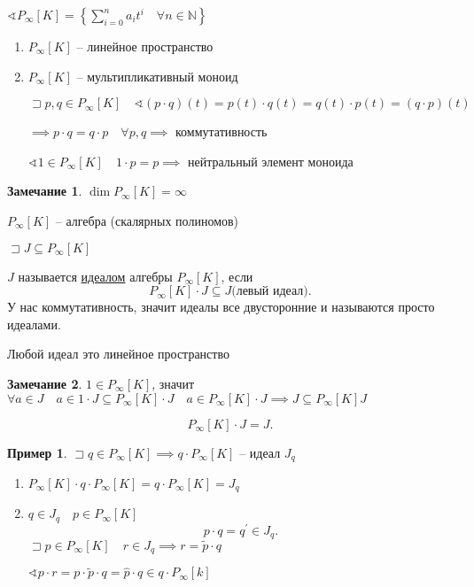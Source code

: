 \documentclass{book}
\newcommand\N{\ensuremath{\mathbb{N}}}
\newcommand{\p}[1]{#1^{\prime}}
\newcommand{\tl}[1]{\widetilde{#1}}
\theoremstyle{definition}
\newtheorem*{note}{Замечание}
\newtheorem*{example}{Пример}
\begin{document}
$\sphericalangle P_{\infty }[K] = \left\{ \sum_{i=0}^{n} a_it^i\quad \forall n\in \N  \right\} $

\begin{enumerate}
    \item $P_{\infty }[K]$ -- линейное пространство
    \item $P_{\infty }[K]$ -- мультипликативный моноид

        $\sqsupset p, q\in P_{\infty }[K]\quad \sphericalangle (p\cdot q)(t) = p(t)\cdot q(t) = q(t)\cdot p(t) = \left( q\cdot p \right) (t)$

        $\implies p\cdot q = q\cdot p\quad \forall p, q\implies $ коммутативность

        $\sphericalangle 1\in P_{\infty }[K]\quad 1\cdot p = p \implies $ нейтральный элемент моноида
\end{enumerate}

\begin{note}
    $\dim P_{\infty }[K] = \infty $
\end{note}

\begin{statement}
    $P_{\infty }[K]$ -- алгебра (скалярных полиномов)
\end{statement}

$\sqsupset J\subseteq P_{\infty }[K]$

\begin{definition}
    $J$ называется \underline{идеалом} алгебры  $P_{\infty }[K]$, если \[
        P_{\infty }[K] \cdot  J\subseteq J \text{(левый идеал)}
    .\]     
    У нас коммутативность, значит идеалы все двусторонние и называются просто идеалами.

    Любой идеал это линейное пространство
\end{definition}

\begin{note}
    $1\in P_{\infty }[K]$, значит $\forall a\in J\quad a\in 1\cdot J\subseteq P_{\infty }[K]\cdot J\quad a\in P_{\infty }[K]\cdot J \implies J\subseteq P_{\infty }[K]J$

    \[
        P_{\infty }[K]\cdot J = J
    .\] 
\end{note}

\begin{example}
    $\sqsupset q\in P_{\infty }[K] \implies q\cdot P_{\infty }[K]$ -- идеал $J_q$

    \begin{enumerate}
        \item $P_{\infty }[K] \cdot  q \cdot  P_{\infty }[K] = q \cdot  P_{\infty }[K]  = J_q$
        \item $q\in J_q\quad p\in P_{\infty }[K]$  \[
        p \cdot  q = \p q\in J_q
        .\]
        $\sqsupset p\in P_{\infty }[K]\quad r\in J_q \implies  r = \tl p \cdot  q$

        $\sphericalangle p \cdot  r = p \cdot  \tl p \cdot  q = \hat p \cdot  q\in q\cdot P_{\infty }[k]$
         
    \end{enumerate}
\end{example}
\end{document}
